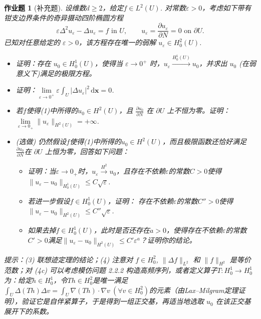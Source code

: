 \documentclass[UTF8,fontset=windows,12pt]{ctexart}
\theoremstyle{kaiti-theorem}
\newtheorem{problem}{作业题}
\numberwithin{equation}{section}
\newcommand{\bds}[1]{\boldsymbol{#1}}  %
\newcommand{\p}{\partial}
\newcommand{\lap}{\Delta}
\newcommand{\nab}{\nabla}
\newcommand{\dxx}{\,\mathrm{d}\bds{x}}
\newcommand{\iu}{\int_{U}}
\newcommand{\eps}{\varepsilon}
\begin{document}
\begin{problem}[补充题]
	设维数$d\geqslant 2$，给定$f\in L^2(U)$. 对常数$\eps>0$，考虑如下带有钳支边界条件的奇异摄动四阶椭圆方程
	\[
	\eps\lap^2u_\eps - \lap u_\eps = f \text{ in }U,\quad\quad u_\eps=\frac{\p u_\eps}{\p N}=0\text{ on }\p U.
	\]已知对任意给定的 $\eps > 0$，该方程存在唯一的弱解 $u_\eps\in H_0^2(U)$.
	       \begin{itemize}
   	\item [(1)] 证明：存在 $u_0 \in H_0^1(U)$，使得当 $\eps \to 0^+$ 时，$u_\eps\xrightarrow{H_0^1(U)} u_0$，并求出 $u_0$ (在弱意义下)满足的极限方程。
   	\item [(2)] 证明：$\lim\limits_{\eps \to 0^+} \eps \int_U |\lap u_\eps|^2 \dxx = 0$.
   	\item [(3)] 若$f$使得(1)中所得的$u_0\in H^2(U)$，且 $\frac{\p u_0}{\p N}$ 在 $\partial U$ 上不恒为零。证明：$\lim\limits_{\eps\to 0_+}\|u_\eps\|_{H^2(U)}=+\infty$.
   	\item [(4)] (选做) 仍然假设$f$使得(1)中所得的$u_0\in H^2(U)$，而且极限函数还恰好满足 $\frac{\p u_0}{\p N}$在 $\partial U$ 上恒为零，回答如下问题：
   	\begin{itemize}
   		\item [(4a)] 证明：当$\eps\to 0_+$时，$u_\eps\xrightarrow{H^2}u_0$，且存在不依赖$\eps$的常数$C>0$使得 $\|u_\eps - u_0\|_{H_0^1(U)} \leqslant C\sqrt{\eps}$. 
   		\item [(4b)] 若进一步假设$f\in H_0^1(U)$，证明： 存在不依赖$\eps$的常数$C''>0$使得 $\|u_\eps - u_0\|_{H^2(U)} \leqslant C''\sqrt{\eps}$. 
   		\item [(4c)] 如果去掉$f\in H_0^1(U)$，此时是否还存在$a>0$，使得存在不依赖$\eps$的常数$C'>0$满足$\|u_\eps - u_0\|_{H^2(U)} \leqslant C'\eps^a$？证明你的结论。
   	\end{itemize}
   \end{itemize}
   
   提示：(3) 联想迹定理的结论；(4) 注意对 $f\in H_0^2$,  $\|\lap f\|_{L^2}$ 和 $\|f\|_{H^2}$ 是等价范数；对 (4c) 可以考虑模仿问题 2.2.2 构造高频序列，或者定义算子$T:H_0^1\to H_0^1$为：给定$h\in H_0^1$，令$Th\in H_0^2$是唯一满足 $\iu \lap(Th) \lap v=\iu \nab(Th)\cdot\nab v~(\forall v\in H_0^2)$的元素（由Lax--Milgram定理证明），验证它是自伴紧算子，于是得到一组正交基，再适当地选取 $u_0$ 在该正交基展开下的系数。
\end{problem}
\end{document}
